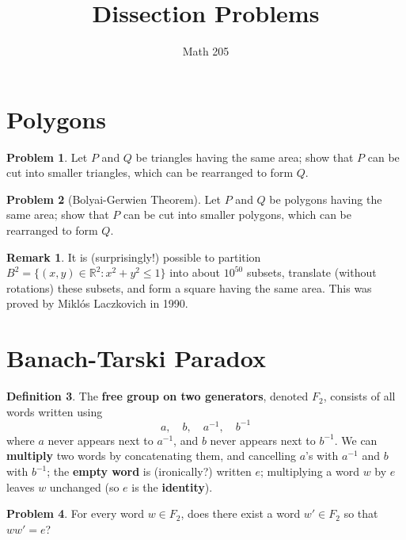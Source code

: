 \documentclass[12pt]{article}
\title{Dissection Problems}
\author{Math 205}
\newcommand{\R}{\mathbb{R}}
\theoremstyle{definition}
\newtheorem{problem}{Problem}
\newtheorem{definition}[problem]{Definition}
\newtheorem*{remark}{Remark}
\begin{document}
\maketitle

\section*{Polygons}

\begin{problem}
  Let $P$ and $Q$ be triangles having the same area; show that $P$ can
  be cut into smaller triangles, which can be rearranged to form $Q$.
\end{problem}

\begin{problem}[Bolyai-Gerwien Theorem]
  Let $P$ and $Q$ be polygons having the same area; show that $P$ can
  be cut into smaller polygons, which can be rearranged to form $Q$.
\end{problem}

\begin{remark}
  It is (surprisingly!) possible to partition $B^2 = \{(x,y) \in \R^2 : x^2 +
  y^2 \leq 1 \}$ into about $10^{50}$ subsets, translate (without rotations)
  these subsets, and form a square having the same area.  This was
  proved by Mikl\'os Laczkovich in 1990.
\end{remark}

\section*{Banach-Tarski Paradox}

\begin{definition}
  The \textbf{free group on two generators}, denoted $F_2$, consists
  of all words written using
$$
a, \hspace{1em} b, \hspace{1em} a^{-1}, \hspace{1em} b^{-1}
$$
where $a$ never appears next to $a^{-1}$, and $b$ never appears next
to $b^{-1}$.  We can \textbf{multiply} two words by concatenating
them, and cancelling $a$'s with $a^{-1}$ and $b$ with $b^{-1}$; the
\textbf{empty word} is (ironically?) written $e$; multiplying a word
$w$ by $e$ leaves $w$ unchanged (so $e$ is the \textbf{identity}).
\end{definition}

\begin{problem}
  For every word $w \in F_2$, does there exist a word $w' \in F_2$ so
  that $w w' = e$?
\end{problem}
\end{document}
